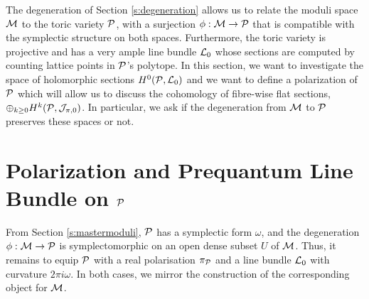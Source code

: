 
	The degeneration of Section \ref{s:degeneration} allows us to relate the moduli space $\mathcal{M}$ to the toric variety $\mathcal{P}$, with a surjection $\phi:\mathcal{M}\to \mathcal{P}$ that is compatible with the symplectic structure on both spaces. Furthermore, the toric variety is projective and has a very ample line bundle $\mathcal{L}_0$ whose sections are computed by counting lattice points in $\mathcal{P}$'s polytope. In this section, we want to investigate the space of holomorphic sections $H^0(\mathcal{P},\mathcal{L}_0)$ and we want to define a polarization of $\mathcal{P}$ which will allow us to discuss the cohomology of fibre-wise flat sections, $\oplus_{k\geq 0}H^k(\mathcal{P}, \mathcal{J}_{\pi,0})$. In particular, we ask if the degeneration from $\mathcal{M}$ to $\mathcal{P}$ preserves these spaces or not.
	 
\section{Polarization and Prequantum Line Bundle on $\mathcal{P}$}
	From Section \ref{s:mastermoduli}, $\mathcal{P}$ has a symplectic form $\omega$, and the degeneration $\phi:\mathcal{M}\to \mathcal{P}$ is symplectomorphic on an open dense subset $U$ of $\mathcal{M}$. Thus, it remains to equip $\mathcal{P}$ with a real polarisation $\pi_{\mathcal{P}}$ and a line bundle $\mathcal{L}_0$ with curvature $2\pi i \omega$. In both cases, we mirror the construction of the corresponding object for $\mathcal{M}$.
	
